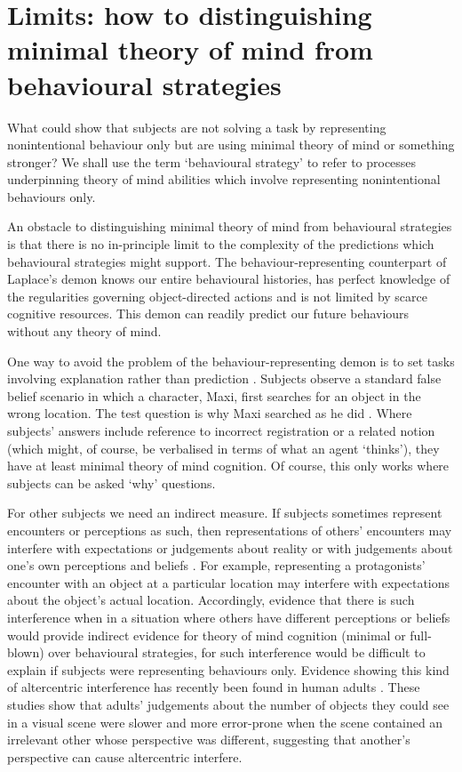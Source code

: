 \documentclass[12pt,\papersize]{extarticle}
\begin{document}
\section{Limits: how to distinguishing minimal theory of mind from behavioural strategies}
\label{sec:limits2}
What could show that subjects are not solving a task by representing nonintentional behaviour only but are using minimal theory of mind or something stronger?  
We shall use the term ‘behavioural strategy’ to refer to processes underpinning theory of mind abilities which involve representing nonintentional behaviours only. 

An obstacle to distinguishing minimal theory of mind from behavioural strategies is that there is no in-principle limit to the complexity of the predictions which behavioural strategies might support.  The behaviour-representing counterpart of Laplace’s demon knows our entire behavioural histories, has perfect knowledge of the regularities governing object-directed actions and is not limited by scarce cognitive resources.  This demon can readily predict our future behaviours without any theory of mind.  

One way to avoid the problem of the behaviour-representing demon is to set tasks involving explanation rather than prediction \citep[compare][p.\ Chapter 8]{en_167}.  Subjects observe a standard false belief scenario in which a character, Maxi, first searches for an object in the wrong location.  The test question is why Maxi searched as he did \citep[see e.g.][]{en_80, en_352}.  Where subjects’ answers include reference to incorrect registration or a related notion (which might, of course, be verbalised in terms of what an agent ‘thinks’), they have at least minimal theory of mind cognition.  Of course, this only works where subjects can be asked ‘why’ questions.

For other subjects we need an indirect measure.  If subjects sometimes represent encounters or perceptions as such, then representations of others’ encounters may interfere with expectations or judgements about reality or with judgements about one’s own perceptions and beliefs \citep[so-called `altercentric interference',][]{Samson:2010jm}.  For example, representing a protagonists’ encounter with an object at a particular location may interfere with expectations about the object’s actual location.  Accordingly, evidence that there is such interference when in a situation where others have different perceptions or beliefs would provide indirect evidence for theory of mind cognition (minimal or full-blown) over behavioural strategies, for such interference would be difficult to explain if subjects were representing behaviours only. Evidence showing this kind of altercentric interference has recently been found in human adults \citep[]{en_1797, Samson:2010jm}. These studies show that adults’ judgements about the number of objects they could see in a visual scene were slower and more error-prone when the scene contained an irrelevant other whose perspective was different, suggesting that another’s perspective can cause altercentric interfere. 
\end{document}

